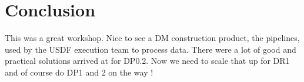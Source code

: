 \section{Conclusion}

This was a great workshop.
Nice to see a DM construction product, the pipelines,  used by the USDF execution team to process data.
There were a lot of good and practical solutions arrived at for DP0.2.
Now we need to scale that up for DR1 and of course do  DP1 and 2 on the way !
